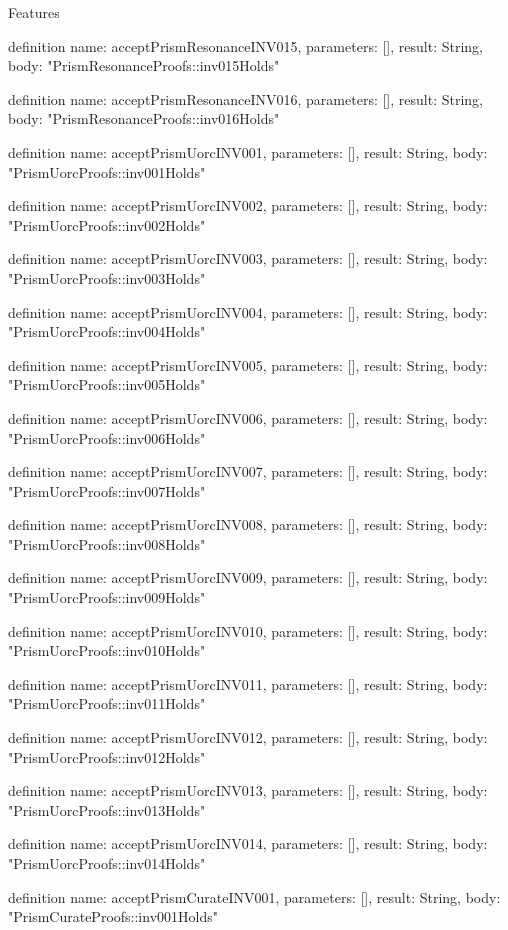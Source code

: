 \begin{lexlean}{Features}
\begin{semanticmodule}
definition{
  name: acceptPrismResonanceINV015,
  parameters: [],
  result: String,
  body: "PrismResonanceProofs::inv015Holds"
}

definition{
  name: acceptPrismResonanceINV016,
  parameters: [],
  result: String,
  body: "PrismResonanceProofs::inv016Holds"
}

definition{
  name: acceptPrismUorcINV001,
  parameters: [],
  result: String,
  body: "PrismUorcProofs::inv001Holds"
}

definition{
  name: acceptPrismUorcINV002,
  parameters: [],
  result: String,
  body: "PrismUorcProofs::inv002Holds"
}

definition{
  name: acceptPrismUorcINV003,
  parameters: [],
  result: String,
  body: "PrismUorcProofs::inv003Holds"
}

definition{
  name: acceptPrismUorcINV004,
  parameters: [],
  result: String,
  body: "PrismUorcProofs::inv004Holds"
}

definition{
  name: acceptPrismUorcINV005,
  parameters: [],
  result: String,
  body: "PrismUorcProofs::inv005Holds"
}

definition{
  name: acceptPrismUorcINV006,
  parameters: [],
  result: String,
  body: "PrismUorcProofs::inv006Holds"
}

definition{
  name: acceptPrismUorcINV007,
  parameters: [],
  result: String,
  body: "PrismUorcProofs::inv007Holds"
}

definition{
  name: acceptPrismUorcINV008,
  parameters: [],
  result: String,
  body: "PrismUorcProofs::inv008Holds"
}

definition{
  name: acceptPrismUorcINV009,
  parameters: [],
  result: String,
  body: "PrismUorcProofs::inv009Holds"
}

definition{
  name: acceptPrismUorcINV010,
  parameters: [],
  result: String,
  body: "PrismUorcProofs::inv010Holds"
}

definition{
  name: acceptPrismUorcINV011,
  parameters: [],
  result: String,
  body: "PrismUorcProofs::inv011Holds"
}

definition{
  name: acceptPrismUorcINV012,
  parameters: [],
  result: String,
  body: "PrismUorcProofs::inv012Holds"
}

definition{
  name: acceptPrismUorcINV013,
  parameters: [],
  result: String,
  body: "PrismUorcProofs::inv013Holds"
}

definition{
  name: acceptPrismUorcINV014,
  parameters: [],
  result: String,
  body: "PrismUorcProofs::inv014Holds"
}

definition{
  name: acceptPrismCurateINV001,
  parameters: [],
  result: String,
  body: "PrismCurateProofs::inv001Holds"
}


\end{semanticmodule}
\end{lexlean}
